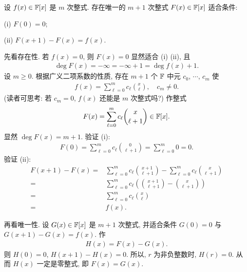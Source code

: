 \begin{proposition}
    设 $f(x) \in \mathbb{F}[x]$ 是 $m$ 次整式. 存在唯一的 $m+1$ 次整式 $F(x) \in \mathbb{F}[x]$ 适合条件:

    (i) $F(0) = 0$;

    (ii) $F(x + 1) - F(x) = f(x)$.
\end{proposition}

\begin{pf}
    先看存在性. 若 $f(x) = 0$, 则 $F(x) = 0$ 显然适合 (i) (ii), 且
    \begin{align*}
        \deg F(x) = -\infty = -\infty + 1 = \deg f(x) + 1.
    \end{align*}
    设 $m \geq 0$. 根据广义二项系数的性质, 存在 $m+1$ 个 $\mathbb{F}$ 中元 $c_0$, $\cdots$, $c_{m}$ 使
    \begin{align*}
        f(x) = \sum_{\ell = 0}^{m} c_\ell \binom{x}{\ell}, \quad c_{m} \neq 0.
    \end{align*}
    (读者可思考: 若 $c_{m} = 0$, $f(x)$ 还能是 $m$ 次整式吗?) 作整式
    \begin{align*}
        F(x) = \sum_{\ell = 0}^{m} c_\ell \binom{x}{\ell+1} \in \mathbb{F}[x].
    \end{align*}
    显然 $\deg F(x) = m + 1$. 验证 (i):
    \begin{align*}
        F(0) = \sum_{\ell = 0}^{m} c_\ell \binom{0}{\ell+1} = \sum_{\ell = 0}^{m} 0 = 0.
    \end{align*}
    验证 (ii):
    \begin{align*}
        F(x + 1) - F(x)
        = {} & \sum_{\ell = 0}^{m} c_\ell \binom{x+1}{\ell+1} - \sum_{\ell = 0}^{m} c_\ell \binom{x}{\ell+1} \\
        = {} & \sum_{\ell = 0}^{m} c_\ell \left( \binom{x+1}{\ell+1} - \binom{x}{\ell+1} \right)             \\
        = {} & \sum_{\ell = 0}^{m} c_\ell \binom{x}{\ell}                                                    \\
        = {} & f(x).
    \end{align*}

    再看唯一性. 设 $G(x) \in \mathbb{F}[x]$ 是 $m+1$ 次整式, 并适合条件 $G(0) = 0$ 与 $G(x + 1) - G(x) = f(x)$. 作
    \begin{align*}
        H(x) = F(x) - G(x).
    \end{align*}
    则 $H(0) = 0$, $H(x + 1) - H(x) = 0$. 所以, $r$ 为非负整数时, $H(r) = 0$. 从而 $H(x)$ 一定是零整式, 即 $F(x) = G(x)$.
\end{pf}

